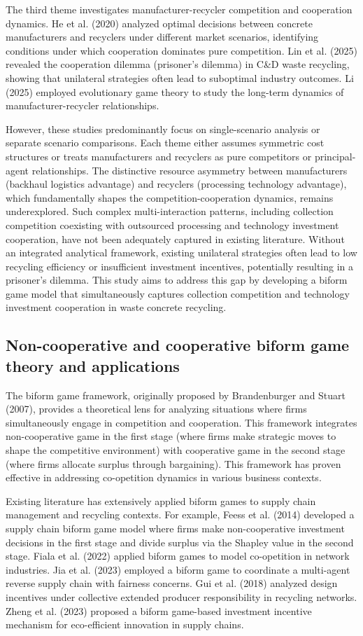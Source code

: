 \documentclass[authoryear,preprint,review,times,10pt]{elsarticle}
\begin{document}
The third theme investigates manufacturer-recycler competition and cooperation dynamics. He et al. (2020) analyzed optimal decisions between concrete manufacturers and recyclers under different market scenarios, identifying conditions under which cooperation dominates pure competition. Lin et al. (2025) revealed the cooperation dilemma (prisoner's dilemma) in C\&D waste recycling, showing that unilateral strategies often lead to suboptimal industry outcomes. Li (2025) employed evolutionary game theory to study the long-term dynamics of manufacturer-recycler relationships.

However, these studies predominantly focus on single-scenario analysis or separate scenario comparisons. Each theme either assumes symmetric cost structures or treats manufacturers and recyclers as pure competitors or principal-agent relationships. The distinctive resource asymmetry between manufacturers (backhaul logistics advantage) and recyclers (processing technology advantage), which fundamentally shapes the competition-cooperation dynamics, remains underexplored. Such complex multi-interaction patterns, including collection competition coexisting with outsourced processing and technology investment cooperation, have not been adequately captured in existing literature. Without an integrated analytical framework, existing unilateral strategies often lead to low recycling efficiency or insufficient investment incentives, potentially resulting in a prisoner's dilemma. This study aims to address this gap by developing a biform game model that simultaneously captures collection competition and technology investment cooperation in waste concrete recycling.

\subsection{Non-cooperative and cooperative biform game theory and applications}
The biform game framework, originally proposed by Brandenburger and Stuart (2007), provides a theoretical lens for analyzing situations where firms simultaneously engage in competition and cooperation. This framework integrates non-cooperative game in the first stage (where firms make strategic moves to shape the competitive environment) with cooperative game in the second stage (where firms allocate surplus through bargaining). This framework has proven effective in addressing co-opetition dynamics in various business contexts.

Existing literature has extensively applied biform games to supply chain management and recycling contexts. For example, Feess et al. (2014) developed a supply chain biform game model where firms make non-cooperative investment decisions in the first stage and divide surplus via the Shapley value in the second stage. Fiala et al. (2022) applied biform games to model co-opetition in network industries. Jia et al. (2023) employed a biform game to coordinate a multi-agent reverse supply chain with fairness concerns. Gui et al. (2018) analyzed design incentives under collective extended producer responsibility in recycling networks. Zheng et al. (2023) proposed a biform game-based investment incentive mechanism for eco-efficient innovation in supply chains.
\end{document}
